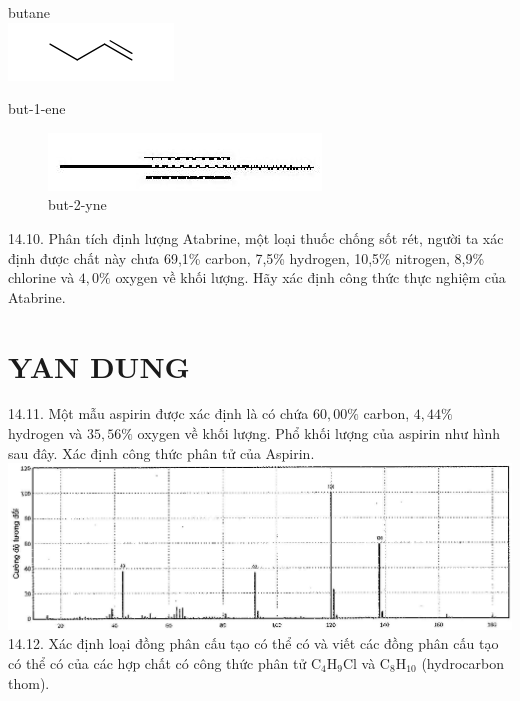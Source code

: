\documentclass[10pt]{article}
\begin{document}
butane\\
\includegraphics{smile-484155c357519701b1ad5e4d7f9341e194acd2a4}

but-1-ene

\begin{figure}[h]
\begin{center}
  \includegraphics[width=\textwidth]{2025_10_23_fa9073eecee116ad8cf2g-49}
\captionsetup{labelformat=empty}
\caption{but-2-yne}
\end{center}
\end{figure}

14.10. Phân tích định lượng Atabrine, một loại thuốc chống sốt rét, người ta xác định được chất này chưa 69,1\% carbon, 7,5\% hydrogen, 10,5\% nitrogen, 8,9\% chlorine và $4,0 \%$ oxygen về khối lượng. Hãy xác định công thức thực nghiệm của Atabrine.

\section*{YAN DUNG}
14.11. Một mẫu aspirin được xác định là có chứa $60,00 \%$ carbon, $4,44 \%$ hydrogen và $35,56 \%$ oxygen về khối lượng. Phổ khối lượng của aspirin như hình sau đây. Xác định công thức phân tử của Aspirin.\\
\includegraphics[max width=\textwidth, center]{2025_10_23_fa9073eecee116ad8cf2g-49(1)}\\
14.12. Xác định loại đồng phân cấu tạo có thể có và viết các đồng phân cấu tạo có thể có của các hợp chất có công thức phân tử $\mathrm{C}_{4} \mathrm{H}_{9} \mathrm{Cl}$ và $\mathrm{C}_{8} \mathrm{H}_{10}$ (hydrocarbon thom).
\end{document}
